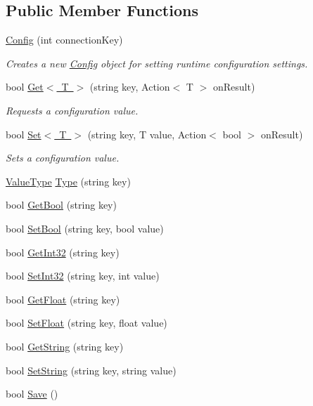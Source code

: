 \subsection*{Public Member Functions}
\begin{DoxyCompactItemize}
\item 
\mbox{\hyperlink{class_leap_1_1_config_a5e0c85350a233e20b508189204fde82f}{Config}} (int connection\+Key)
\begin{DoxyCompactList}\small\item\em Creates a new \mbox{\hyperlink{class_leap_1_1_config}{Config}} object for setting runtime configuration settings. \end{DoxyCompactList}\item 
bool \mbox{\hyperlink{class_leap_1_1_config_a4196147f26b176afb93dc165fedfc8d0}{Get$<$ T $>$}} (string key, Action$<$ T $>$ on\+Result)
\begin{DoxyCompactList}\small\item\em Requests a configuration value. \end{DoxyCompactList}\item 
bool \mbox{\hyperlink{class_leap_1_1_config_acd77254986861d4e7592b5a619a82388}{Set$<$ T $>$}} (string key, T value, Action$<$ bool $>$ on\+Result)
\begin{DoxyCompactList}\small\item\em Sets a configuration value. \end{DoxyCompactList}\item 
\mbox{\hyperlink{class_leap_1_1_config_aee9819af7eacacc324aa72619310a9d8}{Value\+Type}} \mbox{\hyperlink{class_leap_1_1_config_a2fa1a76ec4aecb9d7a01aba0a2de4e00}{Type}} (string key)
\item 
bool \mbox{\hyperlink{class_leap_1_1_config_abad3addef437788d854f8fd5fcd5f6be}{Get\+Bool}} (string key)
\item 
bool \mbox{\hyperlink{class_leap_1_1_config_a48ee08f47555ecc07da20e24c64a34b4}{Set\+Bool}} (string key, bool value)
\item 
bool \mbox{\hyperlink{class_leap_1_1_config_abd25aba72fa00937fbec3d499f52a70a}{Get\+Int32}} (string key)
\item 
bool \mbox{\hyperlink{class_leap_1_1_config_a787f4eb383b5e56216345227efb6d378}{Set\+Int32}} (string key, int value)
\item 
bool \mbox{\hyperlink{class_leap_1_1_config_aead7d2a5648223fe040b3b53e51ac5b6}{Get\+Float}} (string key)
\item 
bool \mbox{\hyperlink{class_leap_1_1_config_aea39b0e2cb819f87d8356ac216a525cb}{Set\+Float}} (string key, float value)
\item 
bool \mbox{\hyperlink{class_leap_1_1_config_a50bd7b7209f1d9428910e88278c6b750}{Get\+String}} (string key)
\item 
bool \mbox{\hyperlink{class_leap_1_1_config_a1fc49204d44638f4ffe3ea91449a2492}{Set\+String}} (string key, string value)
\item 
bool \mbox{\hyperlink{class_leap_1_1_config_a631db08c670e9df74b6873669d9636eb}{Save}} ()
\end{DoxyCompactItemize}


